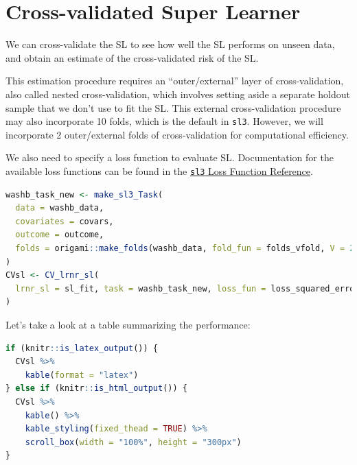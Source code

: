 \documentclass[12pt, krantz2,]{krantz}
\newcommand{\passthrough}[1]{#1}
\theoremstyle{definition}
\theoremstyle{definition}
\theoremstyle{definition}
\newcommand{\1}{\mathbbm{1}}
\begin{document}
\hypertarget{cross-validated-super-learner}{%
\section{Cross-validated Super Learner}\label{cross-validated-super-learner}}

We can cross-validate the SL to see how well the SL performs on unseen data,
and obtain an estimate of the cross-validated risk of the SL.

This estimation procedure requires an ``outer/external'' layer of
cross-validation, also called nested cross-validation, which involves setting
aside a separate holdout sample that we don't use to fit the SL. This external
cross-validation procedure may also incorporate 10 folds, which is the default
in \passthrough{\lstinline!sl3!}. However, we will incorporate 2 outer/external folds of
cross-validation for computational efficiency.

We also need to specify a loss function to evaluate SL. Documentation for the
available loss functions can be found in the \href{https://tlverse.org/sl3/reference/loss_functions.html}{\passthrough{\lstinline!sl3!} Loss
Function Reference}.

\begin{lstlisting}[language=R]
washb_task_new <- make_sl3_Task(
  data = washb_data,
  covariates = covars,
  outcome = outcome,
  folds = origami::make_folds(washb_data, fold_fun = folds_vfold, V = 2)
)
CVsl <- CV_lrnr_sl(
  lrnr_sl = sl_fit, task = washb_task_new, loss_fun = loss_squared_error
)
\end{lstlisting}

Let's take a look at a table summarizing the performance:

\begin{lstlisting}[language=R]
if (knitr::is_latex_output()) {
  CVsl %>%
    kable(format = "latex")
} else if (knitr::is_html_output()) {
  CVsl %>%
    kable() %>%
    kable_styling(fixed_thead = TRUE) %>%
    scroll_box(width = "100%", height = "300px")
}
\end{lstlisting}
\end{document}
